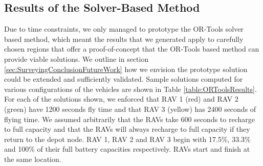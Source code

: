 \subsection{Results of the Solver-Based Method}

Due to time constraints, we only managed to prototype the OR-Tools solver based method, which meant the results that we generated apply to carefully chosen regions that offer a proof-of-concept that the OR-Tools based method can provide viable solutions. We outline in section \ref{sec:SurveyingConclusionFutureWork} how we envision the prototype solution could be extended and sufficiently validated. Sample solutions computed for various configurations of the vehicles are shown in Table \ref{table:ORToolsResults}. For each of the solutions shown, we enforced that RAV 1 (red) and RAV 2 (green) have 1200 seconds fly time and that RAV 3 (yellow) has 2400 seconds of flying time. We assumed arbitrarily that the RAVs take 600 seconds to recharge to full capacity and that the RAVs will always recharge to full capacity if they return to the depot node. RAV 1, RAV 2 and RAV 3 begin with 17.5\%, 33.3\% and 100\% of their full battery capacities respectively. RAVs start and finish at the same location.

